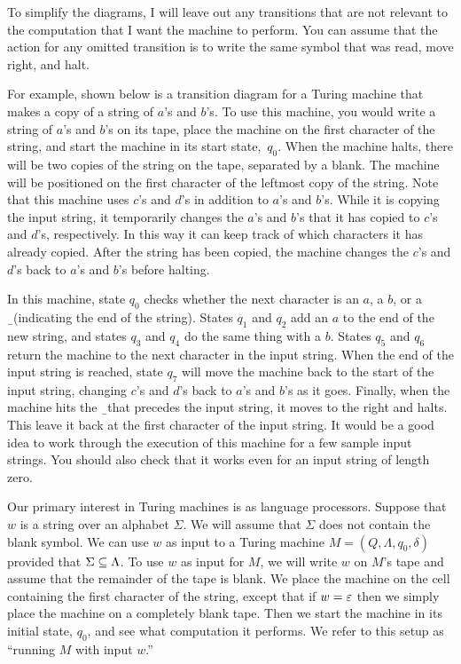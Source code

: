 

To simplify the diagrams, I will leave out any transitions that are
not relevant to the computation that I want the machine to perform.
You can assume that the action for any omitted transition is
to write the same symbol that was read, move right, and halt.

For example, shown below is a transition diagram for a Turing machine
that makes a copy of a string of $a$'s and $b$'s.  To use this machine,
you would write a string of $a$'s and $b$'s on its tape, place
the machine on the first character of the string, and start the
machine in its start state,~$q_0$.  When the machine halts, there will be
two copies of the string on the tape, separated by a blank.
The machine will be positioned on the first character of the leftmost
copy of the string.  Note that this machine uses $c$'s and
$d$'s in addition to $a$'s and $b$'s.  While it is copying the
input string, it temporarily changes the $a$'s and $b$'s that it
has copied to $c$'s and $d$'s, respectively.  In this way it can 
keep track of which characters it has already copied.  After the
string has been copied, the machine changes the $c$'s and $d$'s
back to $a$'s and $b$'s before halting.

\breakSixByNine


In this machine, state $q_0$ checks whether the next character
is an $a$, a $b$, or a \b\ (indicating the end of the string).
States $q_1$ and $q_2$ add an $a$ to the end of the new string,
and states $q_3$ and $q_4$ do the same thing with a $b$.
States $q_5$ and $q_6$ return the machine to the next character
in the input string.  When the end of the input string is reached,
state $q_7$ will move the machine back to the start of the input
string, changing $c$'s and $d$'s back to $a$'s and $b$'s as it goes.
Finally, when the machine hits the \b\ that precedes the input string,
it moves to the right and halts.  This leave it back at the first
character of the input string.  It would be a good idea to work through
the execution of this machine for a few sample input strings.
You should also check that it works even for an input string of
length zero.

\medbreak

Our primary interest in Turing machines is as language processors.
Suppose that $w$ is a string over an alphabet $\Sigma$.  We will assume
that $\Sigma$ does not contain the blank symbol.  We can use $w$ as
input to a Turing machine $M=(Q,\Lambda,q_0,\delta)$ provided that
$\Sigma\subseteq\Lambda$.  To use $w$ as input for $M$, we will write
$w$ on $M$'s tape and assume that the remainder of the tape is blank.
We place the machine on the cell containing the first character
of the string, except that if $w=\varepsilon$ then we simply place the
machine on a completely blank tape.   Then we start the machine in its 
initial state, $q_0$, and see what computation it performs.
We refer to this setup as ``running $M$ with input $w$.''

